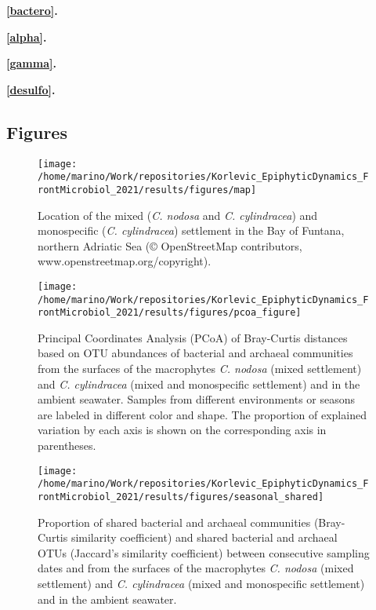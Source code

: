 \documentclass[
  12pt,
]{article}
\begin{document}
\textbf{\autoref{bactero}.} 

\textbf{\autoref{alpha}.} 

\textbf{\autoref{gamma}.} 

\textbf{\autoref{desulfo}.} 

\newpage

\hypertarget{figures}{%
\subsection{Figures}\label{figures}}

\begin{figure}[H]

{\centering \texttt{[image: /home/marino/Work/repositories/Korlevic\_EpiphyticDynamics\_FrontMicrobiol\_2021/results/figures/map]} 

}

\caption{Location of the mixed (\textit{C. nodosa} and \textit{C. cylindracea}) and monospecific (\textit{C. cylindracea}) settlement in the Bay of Funtana, northern Adriatic Sea (© OpenStreetMap contributors, www.openstreetmap.org/copyright).\label{map}}\label{fig:unnamed-chunk-1}
\end{figure}

\begin{figure}[H]

{\centering \texttt{[image: /home/marino/Work/repositories/Korlevic\_EpiphyticDynamics\_FrontMicrobiol\_2021/results/figures/pcoa\_figure]} 

}

\caption{Principal Coordinates Analysis (PCoA) of Bray-Curtis distances based on OTU abundances of bacterial and archaeal communities from the surfaces of the macrophytes \textit{C. nodosa} (mixed settlement) and \textit{C. cylindracea} (mixed and monospecific settlement) and in the ambient seawater. Samples from different environments or seasons are labeled in different color and shape. The proportion of explained variation by each axis is shown on the corresponding axis in parentheses.\label{pcoa}}\label{fig:unnamed-chunk-2}
\end{figure}

\begin{figure}[H]

{\centering \texttt{[image: /home/marino/Work/repositories/Korlevic\_EpiphyticDynamics\_FrontMicrobiol\_2021/results/figures/seasonal\_shared]} 

}

\caption{Proportion of shared bacterial and archaeal communities (Bray-Curtis similarity coefficient) and shared bacterial and archaeal OTUs (Jaccard's similarity coefficient) between consecutive sampling dates and from the surfaces of the macrophytes \textit{C. nodosa} (mixed settlement) and \textit{C. cylindracea} (mixed and monospecific settlement) and in the ambient seawater.\label{shared}}\label{fig:unnamed-chunk-3}
\end{figure}
\end{document}
